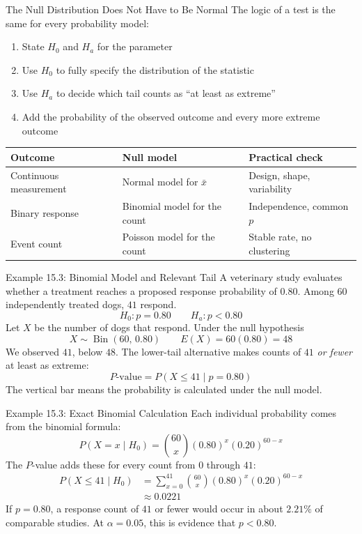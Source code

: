 \documentclass[aspectratio=169]{beamer}
\begin{document}
\begin{frame}{The Null Distribution Does Not Have to Be Normal}
The logic of a test is the same for every probability model:
\begin{enumerate}
  \item State $H_0$ and $H_a$ for the parameter
  \item Use $H_0$ to fully specify the distribution of the statistic
  \item Use $H_a$ to decide which tail counts as ``at least as extreme''
  \item Add the probability of the observed outcome and every more extreme outcome
\end{enumerate}
\begin{center}
\small
\begin{tabularx}{0.94\textwidth}{>{\RaggedRight\arraybackslash}p{} X X}
\toprule
\textbf{Outcome} & \textbf{Null model} & \textbf{Practical check} \\
\midrule
Continuous measurement & Normal model for $\bar{x}$ & Design, shape, variability \\
Binary response & Binomial model for the count & Independence, common $p$ \\
Event count & Poisson model for the count & Stable rate, no clustering \\
\bottomrule
\end{tabularx}
\end{center}
\end{frame}

\begin{frame}{Example 15.3: Binomial Model and Relevant Tail}
A veterinary study evaluates whether a treatment reaches a proposed response probability of $0.80$. Among $60$ independently treated dogs, $41$ respond.
$$H_0:p=0.80 \qquad H_a:p<0.80$$
Let $X$ be the number of dogs that respond. Under the null hypothesis
$$X\sim\operatorname{Bin}(60,\,0.80) \qquad E(X)=60(0.80)=48$$
We observed $41$, below $48$. The lower-tail alternative makes counts of $41$ \emph{or fewer} at least as extreme:
$$P\text{-value}=P(X\le41\mid p=0.80)$$
The vertical bar means the probability is calculated under the null model.
\end{frame}

\begin{frame}{Example 15.3: Exact Binomial Calculation}
Each individual probability comes from the binomial formula:
$$P(X=x\mid H_0)=\binom{60}{x}(0.80)^x(0.20)^{60-x}$$
The $P$-value adds these for every count from $0$ through $41$:
\begin{align*}
P(X\le41\mid H_0)
&=\sum_{x=0}^{41}\binom{60}{x}(0.80)^x(0.20)^{60-x} \\
&\approx 0.0221
\end{align*}
If $p=0.80$, a response count of $41$ or fewer would occur in about $2.21\%$ of comparable studies. At $\alpha=0.05$, this is evidence that $p<0.80$.
\end{frame}
\end{document}
